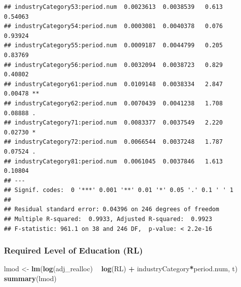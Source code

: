 \documentclass[
]{article}
\newenvironment{Shaded}{\begin{snugshade}}{\end{snugshade}}
\newcommand{\KeywordTok}[1]{\textcolor[rgb]{0.13,0.29,0.53}{\textbf{#1}}}
\newcommand{\NormalTok}[1]{#1}
\newcommand{\OperatorTok}[1]{\textcolor[rgb]{0.81,0.36,0.00}{\textbf{#1}}}
\newcommand{\StringTok}[1]{\textcolor[rgb]{0.31,0.60,0.02}{#1}}
\begin{document}
\begin{verbatim}
## industryCategory53:period.num  0.0023613  0.0038539   0.613  0.54063    
## industryCategory54:period.num  0.0003081  0.0040378   0.076  0.93924    
## industryCategory55:period.num  0.0009187  0.0044799   0.205  0.83769    
## industryCategory56:period.num  0.0032094  0.0038723   0.829  0.40802    
## industryCategory61:period.num  0.0109148  0.0038334   2.847  0.00478 ** 
## industryCategory62:period.num  0.0070439  0.0041238   1.708  0.08888 .  
## industryCategory71:period.num  0.0083377  0.0037549   2.220  0.02730 *  
## industryCategory72:period.num  0.0066544  0.0037248   1.787  0.07524 .  
## industryCategory81:period.num  0.0061045  0.0037846   1.613  0.10804    
## ---
## Signif. codes:  0 '***' 0.001 '**' 0.01 '*' 0.05 '.' 0.1 ' ' 1
## 
## Residual standard error: 0.04396 on 246 degrees of freedom
## Multiple R-squared:  0.9933, Adjusted R-squared:  0.9923 
## F-statistic: 961.1 on 38 and 246 DF,  p-value: < 2.2e-16
\end{verbatim}

\hypertarget{required-level-of-education-rl}{%
\subsubsection{Required Level of Education
(RL)}\label{required-level-of-education-rl}}

\begin{Shaded}
\begin{Highlighting}[]
\NormalTok{lmod <-}\StringTok{ }\KeywordTok{lm}\NormalTok{(}\KeywordTok{log}\NormalTok{(adj_realloc) }\OperatorTok{~}\StringTok{  }\KeywordTok{log}\NormalTok{(RL) }\OperatorTok{+}\StringTok{ }\NormalTok{industryCategory}\OperatorTok{*}\NormalTok{period.num, t)}
\KeywordTok{summary}\NormalTok{(lmod)}
\end{Highlighting}
\end{Shaded}
\end{document}
